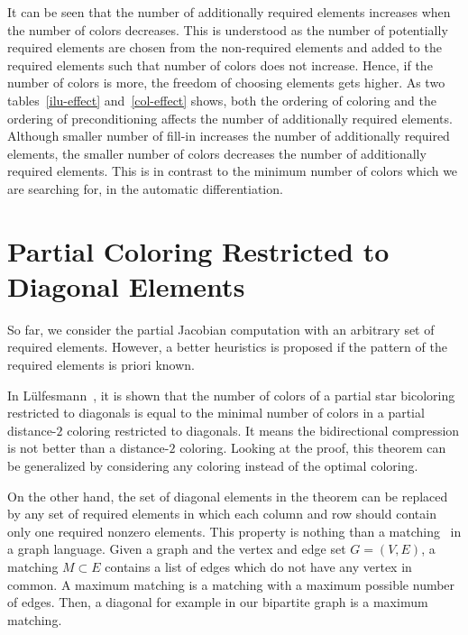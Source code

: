 \documentclass[11pt, twoside,a4paper]{book}
\begin{document}
It can be seen that the number of additionally required elements increases when
the number of colors decreases. This is understood as the number of potentially
required elements are chosen from the non-required elements and added to the required elements
such that number of colors does not increase. Hence, if the number of colors is more,
the freedom of choosing elements gets higher.
As two tables~\ref{ilu-effect} and~\ref{col-effect} shows,
both the ordering of coloring and the ordering of preconditioning affects the number of
additionally required elements. Although smaller number of fill-in increases
the number of additionally required elements, the smaller number of colors
decreases the number of additionally required elements.
This is in contrast to the minimum number of colors which we are searching for,
in the automatic differentiation.


\section{Partial Coloring Restricted to Diagonal Elements}
So far, we consider the partial Jacobian computation with an arbitrary
set of required elements. However, a better heuristics is proposed if the
pattern of the required elements is priori known.

In Lülfesmann~\cite{Lulfesmann2012Fap}, it is shown that the number of colors of
a partial star bicoloring restricted to diagonals is equal to
the minimal number of colors in a partial distance-$2$ coloring restricted
to diagonals. It means the bidirectional compression is not better than
a distance-$2$ coloring.
Looking at the proof, this theorem can be generalized by considering any
coloring instead of the optimal coloring.

On the other hand, the set of diagonal elements in the theorem
can be replaced by any set of required elements
in which each column and row should contain only one required nonzero elements.
This property is nothing than a matching~\cite{bondy2008graph} in a graph language.
Given a graph and the vertex and edge set $G=(V,E)$, a matching $M\subset E$ contains
a list of edges which do not have any vertex in common.
A maximum matching is a matching with a maximum possible number of edges.
Then, a diagonal for example in our bipartite graph is a maximum matching.
\end{document}
